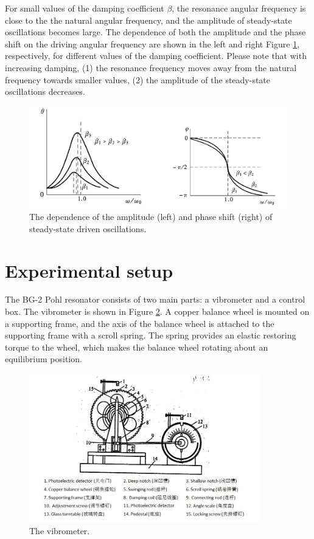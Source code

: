 \documentclass{article}
\begin{document}
For small values of the damping coefficient $\beta$, the resonance angular frequency is close to the the natural angular frequency, and the amplitude of steady-state oscillations becomes large. The dependence of both the amplitude and the phase shift on the driving angular frequency are shown in the left and right Figure \ref{fig-1}, respectively, for different values of the damping coefficient. Please note that with increasing damping, (1) the resonance frequency moves away from the natural frequency towards smaller values, (2) the amplitude of the steady-state oscillations decreases.

\begin{figure}[!h]
	\centering
	\includegraphics[width=13cm]{fig-1.png}
	\caption{The dependence of the amplitude (left) and phase shift (right) of steady-state
driven oscillations.
	\label{fig-1}}
\end{figure}

\section{Experimental setup}

The BG-2 Pohl resonator consists of two main parts: a vibrometer and a control box. The vibrometer is shown in Figure \ref{fig-2}. A copper balance wheel is mounted on a supporting frame, and the axis of the balance wheel is attached to the supporting frame with a scroll spring. The spring provides an elastic restoring torque to the wheel, which makes the balance wheel rotating about an equilibrium position.

\begin{figure}[!h]
	\centering
	\includegraphics[width=10cm]{fig-2.png}
	\caption{The vibrometer.
	\label{fig-2}}
\end{figure}
\end{document}
